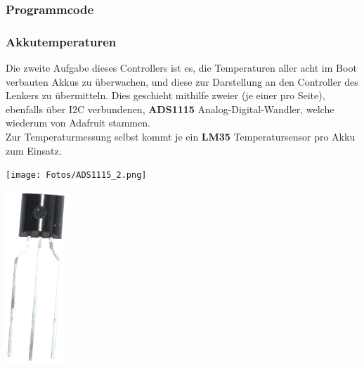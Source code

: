 \newpage
\subsubsection{Programmcode}

\newpage

\subsubsection{Akkutemperaturen}
Die zweite Aufgabe dieses Controllers ist es, die Temperaturen aller acht im Boot verbauten Akkus zu überwachen, und diese zur Darstellung an den Controller des Lenkers zu übermitteln.
Dies geschieht mithilfe zweier (je einer pro Seite), ebenfalls über I2C verbundenen, \textbf{ADS1115} Analog-Digital-Wandler, welche wiederum von Adafruit stammen.\\
Zur Temperaturmessung selbst kommt je ein \textbf{LM35} Temperatursensor pro Akku zum Einsatz.\\

\begin{minipage}{8cm}
    \centering
    \texttt{[image: Fotos/ADS1115\_2.png]}
\end{minipage}
\begin{minipage}{8cm}
    \centering
    \includegraphics[width=0.17\textwidth]{Fotos/LM35.png}
\end{minipage}\\
\vspace{0.5cm}

